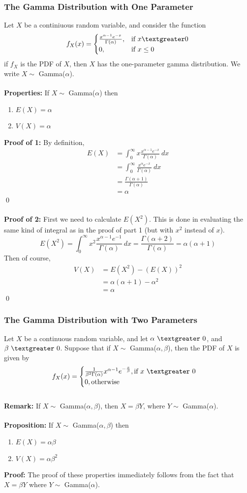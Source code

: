 \documentclass{article}
\newcommand{\gt}{\textgreater}
\newcommand{\Ga}{\Gamma}
\newcommand{\al}{\alpha}
\newcommand{\be}{\beta}
\begin{document}
\subsubsection{The Gamma Distribution with One Parameter}
Let $X$ be a continiuous random variable, and consider the function
\[
f_{X}(x) =
\begin{cases}
	\frac{x^{\alpha -1}e^{-x}}{\Ga(\al)}, &\text{if}\ x \gt 0\\
	0, &\text{if}\ x \leq 0
\end{cases}
\]
if $f_{X}$ is the PDF of $X$, then $X$ has the one-parameter gamma distribution. We write $X \sim$ Gamma($\al$).\\\\
\textbf{Properties:} If $X \sim$ Gamma($\al$) then
\begin{enumerate}
	\item $E(X) = \al$
	\item $V(X) = \al$
\end{enumerate}
\textbf{Proof of 1:} By definition,
\begin{align*}
	E(X) &= \int_{0}^{\infty} x\frac{x^{\al-1}e^{-x}}{\Ga(\al)}\ dx\\
		&= \int_{0}^{\infty} \frac{x^{\al}e^{-x}}{\Ga(\al)}\ dx\\
		&= \frac{\Ga(\al +1)}{\Ga(\al)}\\
		&= \al
\end{align*}
\qed\\\\
\textbf{Proof of 2:} First we need to calculate $E(X^{2})$. This is done in evaluating the same kind of integral as in the proof of part 1 (but with $x^2$ instead of $x$).
\[E(X^2) = \int_{0}^{\infty} x^{2}\frac{x^{\al-1}e^{-1}}{\Ga(\al)}\ dx = \frac{\Ga(\al+2)}{\Ga(\al)} = \al(\al+1)\]
Then of course, 
\begin{align*}
	V(X) &= E(X^2) - (E(X))^2\\
		&= \al(\al+1)-\al^2\\
		&= \al
\end{align*}
\qed
\subsubsection{The Gamma Distribution with Two Parameters}
Let $X$ be a continuous random variable, and let $\al\ \gt\ 0$, and $\be\ \gt\ 0$. Suppose that if $X \sim$ Gamma($\al, \be$), then the PDF of $X$ is given by
\[
f_X(x) = 
\begin{cases}
	\frac{1}{\be^2\Ga(\al)}x^{\al-1}e^{-\frac{x}{\be}}, \text{if}\ x\ \gt\ 0\\
	0, \text{otherwise}
\end{cases}
\]\\
\textbf{Remark:} If $X \sim$ Gamma($\al, \be$), then $X = \be Y$, where $Y \sim$ Gamma($\al$).\\\\
\textbf{Proposition:} If $X \sim$ Gamma($\al, \be$) then
\begin{enumerate}
	\item $E(X) = \al\be$
	\item $V(X) = \al\be^2$
\end{enumerate}
\textbf{Proof:} The proof of these properties immediately follows from the fact that $X=\be Y$ where $Y \sim$ Gamma($\al$).
\end{document}
